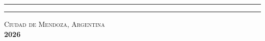 \begin{titlepage}

{\color{uncuyocian}\rule{\textwidth}{0.8pt}}\par\vspace{-0.55em}
{\color{uncuyoazul}\rule{\textwidth}{1.8pt}}\par

\vspace{0.4cm}
{\normalsize \textsc{Ciudad de Mendoza, Argentina}}\\[0.25em]
{\normalsize \textbf{2026}}
\vspace*{-0.3cm}

\end{titlepage}